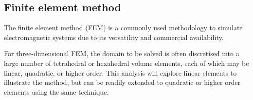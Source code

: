 
\subsection{Finite element method}\label{sec:finiteElementMethod}
The finite element method (FEM) is a commonly used methodology to simulate electromagnetic systems due to its versatility and commercial availability.

For three-dimensional FEM, the domain to be solved is often discretised into a large number of tetrahedral or hexahedral volume elements, each of which may be linear, quadratic, or higher order. This analysis will explore linear elements to illustrate the method, but can be readily extended to quadratic or higher order elements using the same technique.

